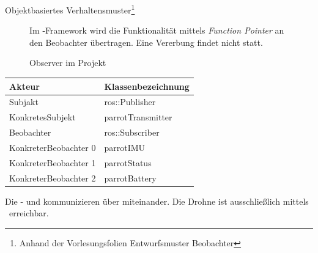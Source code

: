 
Objektbasiertes Verhaltensmuster\footnote{Anhand der Vorlesungsfolien \glq Entwurfsmuster Beobachter\grq}

\clearpage
{}
\begin{figure}[ht!]
\vspace{0.25cm}
\begin{center}
\caption{Observer im Projekt}
\label{fig:Obs}
\end{center}

\vspace{0.25cm}
Im \ROS-Framework wird die Funktionalität mittels \textit{Function Pointer} an den Beobachter übertragen. Eine Vererbung findet nicht statt.\\
\end{figure}


\FloatBarrier
{}
\begin{table}[!ht]
\begin{tabular}{ll}
Akteur				& Klassenbezeichnung \\ \hline
Subjakt				& ros::Publisher\\
KonkretesSubjekt		& parrotTransmitter\\
Beobachter			& ros::Subscriber\\
KonkreterBeobachter 0	& parrotIMU\\
KonkreterBeobachter 1	& parrotStatus\\
KonkreterBeobachter 2	& parrotBattery
\end{tabular}
\end{table}


\FloatBarrier
{}
Die \ROS-\Pub{} und \Sub{} kommunizieren über \Topic[s] miteinander.  Die Drohne ist ausschließlich mittels \ROS\ erreichbar.

